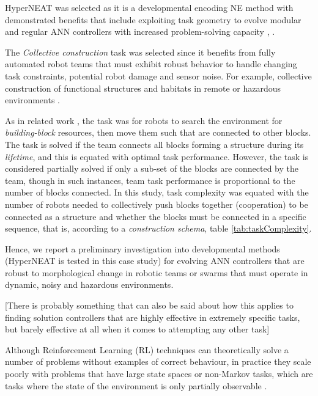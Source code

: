 HyperNEAT was selected as it is a developmental encoding NE method with demonstrated benefits
that include exploiting task geometry to evolve modular and regular ANN controllers with
increased problem-solving capacity \cite{VerbancsicsStanley2011}, \cite{DAmbrosio2013}.





The \textit{Collective construction} task \cite{WerfelPetersenNagpal2014} was selected since it benefits
from fully automated robot teams that must exhibit robust behavior to handle changing task constraints,
potential robot damage and sensor noise.
For example, collective construction of functional structures and habitats in remote or hazardous
environments \cite{WerfelNagpal2008}.

As in related work \cite{WerfelPetersenNagpal2014}, the task was for robots to search the environment
for \textit{building-block} resources, then move them such that are connected to other blocks.
The task is solved if the team connects all blocks forming a structure during its \textit{lifetime}, and this is equated
with optimal task performance.
However, the task is considered partially solved if only a sub-set of the blocks are connected by the team,
though in such instances, team task performance is proportional to the number of blocks connected.
In this study, task complexity was equated with the number of robots needed
to collectively push blocks together (cooperation) to be connected as a structure and whether the blocks
must be connected in a specific sequence, that is, according to a \textit{construction schema},
table \ref{tab:taskComplexity}.

Hence, we report a preliminary investigation into developmental methods (HyperNEAT is tested in this case
study) for evolving ANN controllers that are robust to morphological change in robotic teams or swarms that
must operate in dynamic, noisy and hazardous environments.



[There is probably something that can also be said about how this applies to finding solution controllers that are highly effective in extremely specific tasks, but barely effective at all when it comes to attempting any other task]

Although Reinforcement Learning (RL) techniques can theoretically solve a number of problems without examples of correct behaviour, in practice they scale poorly with problems that have large state spaces or non-Markov tasks, which are tasks where the state of the environment is only partially observable \cite{RefWorks:32}.

